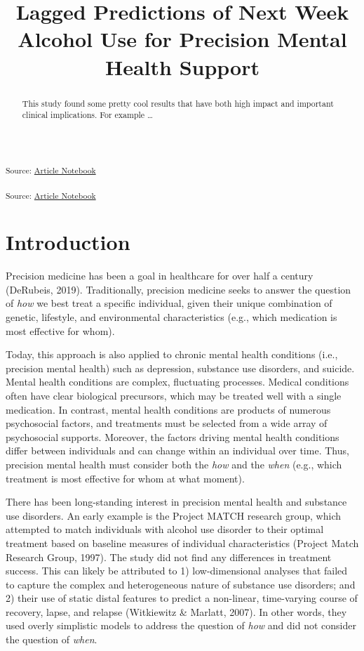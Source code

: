 \documentclass[
]{agujournal2019}
\begin{document}
\title{Lagged Predictions of Next Week Alcohol Use for Precision Mental
Health Support}



\begin{abstract}
This study found some pretty cool results that have both high impact and
important clinical implications. For example \ldots{}
\end{abstract}




\textsubscript{Source:
\href{https://jjcurtin.github.io/study_lag/index.qmd.html}{Article
Notebook}}

\textsubscript{Source:
\href{https://jjcurtin.github.io/study_lag/index.qmd.html}{Article
Notebook}}

\section{Introduction}\label{introduction}

Precision medicine has been a goal in healthcare for over half a century
(DeRubeis, 2019). Traditionally, precision medicine seeks to answer the
question of \emph{how} we best treat a specific individual, given their
unique combination of genetic, lifestyle, and environmental
characteristics (e.g., which medication is most effective for whom).

Today, this approach is also applied to chronic mental health conditions
(i.e., precision mental health) such as depression, substance use
disorders, and suicide. Mental health conditions are complex,
fluctuating processes. Medical conditions often have clear biological
precursors, which may be treated well with a single medication. In
contrast, mental health conditions are products of numerous psychosocial
factors, and treatments must be selected from a wide array of
psychosocial supports. Moreover, the factors driving mental health
conditions differ between individuals and can change within an
individual over time. Thus, precision mental health must consider both
the \emph{how} and the \emph{when} (e.g., which treatment is most
effective for whom at what moment).

There has been long-standing interest in precision mental health and
substance use disorders. An early example is the Project MATCH research
group, which attempted to match individuals with alcohol use disorder to
their optimal treatment based on baseline measures of individual
characteristics (Project Match Research Group, 1997). The study did not
find any differences in treatment success. This can likely be attributed
to 1) low-dimensional analyses that failed to capture the complex and
heterogeneous nature of substance use disorders; and 2) their use of
static distal features to predict a non-linear, time-varying course of
recovery, lapse, and relapse (Witkiewitz \& Marlatt, 2007). In other
words, they used overly simplistic models to address the question of
\emph{how} and did not consider the question of \emph{when}.
\end{document}
